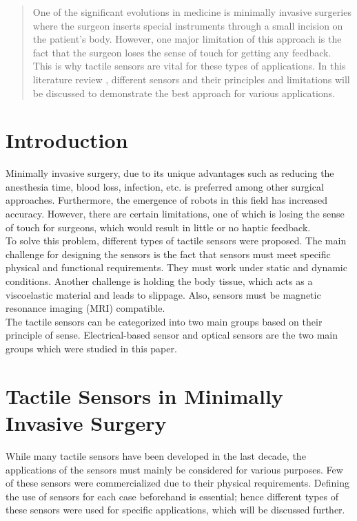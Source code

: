 \documentclass[conference]{IEEEtran}
\begin{document}
\begin{abstract}
	One of the significant evolutions in medicine is minimally invasive surgeries where the surgeon inserts special instruments through a small incision on the patient's body. However, one major limitation of this approach is the fact that the surgeon loses the sense of touch for getting any feedback. This is why tactile sensors are vital for these types of applications. In this literature review \cite{b1}, different sensors and their principles and limitations will be discussed to demonstrate the best approach for various applications. 
\end{abstract}


\section{Introduction}
Minimally invasive surgery, due to its unique advantages such as reducing the anesthesia time, blood loss, infection, etc. is preferred among other surgical approaches. Furthermore, the emergence of robots in this field has increased accuracy. However, there are certain limitations, one of which is losing the sense of touch for surgeons, which would result in little or no haptic feedback.\\ 
To solve this problem, different types of tactile sensors were proposed. The main challenge for designing the sensors is the fact that sensors must meet specific physical and functional requirements. They must work under static and dynamic conditions. Another challenge is holding the body tissue, which acts as a viscoelastic material and leads to slippage. Also, sensors must be magnetic resonance imaging (MRI) compatible.\\ 
The tactile sensors can be categorized into two main groups based on their principle of sense. Electrical-based sensor and optical sensors are the two main groups which were studied in this paper. 

\section {Tactile Sensors in Minimally Invasive Surgery}
While many tactile sensors have been developed in the last decade, the applications of the sensors must mainly be considered for various purposes. Few of these sensors were commercialized due to their physical requirements. Defining the use of sensors for each case beforehand is essential; hence different types of these sensors were used for specific applications, which will be discussed further.
\end{document}
